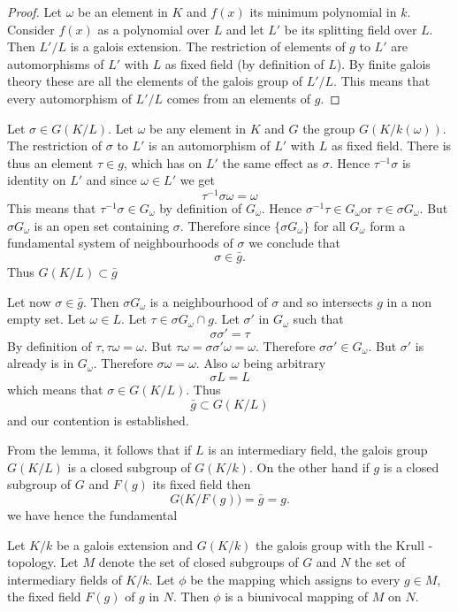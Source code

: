  \begin{proof}
Let $\omega$ be an element in $K$ and $f(x)$ its minimum polynomial in
$k$. Consider $f(x)$ as a polynomial over $L$ and let $L'$ be its
splitting field over $L$. Then $L' /L$ is  a galois extension. The
restriction of elements of $g$ to $L'$ are automorphisms of $L'$ with
$L$ as fixed field (by definition of $L$). By finite galois theory
these are all the elements of the galois group of $L' /L$. This means
that every automorphism of $L'/L$ comes from an elements of $g$.  
 \end{proof} 
 
 Let $\sigma \in G(K/L)$. Let $\omega$ be any element in $K$ and $G$
 the group $G(K/k (\omega ))$. The restriction of $\sigma$ to $L'$ is
 an automorphism of $L'$ with $L$ as fixed field. There is thus an
 element $\tau \in g$, which has on $L'$ the same effect as
 $\sigma$. Hence $\tau^{-1} \sigma$ is identity on $L'$ and since
 $\omega \in L'$ we get 
 $$
 \tau^{-1} \sigma \omega = \omega
 $$
  This means that $\tau^{-1 } \sigma \in G_\omega$ by definition of
 $G_{\omega}$. Hence $\sigma^{-1} \tau \in G_\omega$\pageoriginale or
  $\tau \in 
 \sigma G_{\omega}$. But $\sigma G_{\omega}$ is an open set containing
 $\sigma$. Therefore since $\{ \sigma G_\omega \}$ for all $G_\omega$
 form a fundamental system of neighbourhoods of $\sigma$ we conclude
 that 
 $$
 \sigma \in \bar{g}.
 $$
  Thus $G(K/L) \subset \bar{g}$
 
 Let now $\sigma \in \bar{g}$. Then $\sigma G_\omega$ is a
 neighbourhood of $\sigma$ and so intersects $g$ in a non empty
 set. Let $\omega \in L$. Let $\tau \in \sigma G_\omega \cap g$. Let
 $\sigma'$ in $G_{\omega}$ such that  
 $$
 \sigma \sigma' = \tau
 $$
  By definition of $\tau , \tau \omega = \omega$. But $\tau \omega =
  \sigma \sigma ' \omega = \omega$. Therefore $\sigma \sigma ' \in
  G_{\omega}$. But $\sigma '$ is already is in $G_{\omega}$. Therefore
  $\sigma \omega = \omega$. Also $\omega$ being arbitrary 
 $$
 \sigma L = L
 $$
 which means that $\sigma \in G(K / L)$. Thus
 $$
 \bar{g} \subset G(K/L)
 $$
 and our contention is established.
 
 From the lemma, it follows that if $L$ is an intermediary field, the
 galois group $G(K/L)$ is a closed subgroup of $G(K/k)$. On the other
 hand if $g$ is a closed subgroup of $G$ and $F(g)$ its fixed field
 then  
 $$
 G \big( K/F(g) \big) = \bar{g} = g .
 $$
 we have hence the fundamental

 \begin{thm}\label{c2:thm8}%
Let $K/k$ be a galois extension and $G(K/k)$ the
  galois group with the Krull - topology. Let $M$ denote the
  set of closed subgroups of $G$ and $N$ the set of
  intermediary fields of $K/k$. Let $\phi$  be the mapping which
  assigns to every $g \in M$, the fixed field $F(g)$ of\pageoriginale
  $g$ in $N$. Then $\phi$ is a biunivocal mapping of $M$ on $N$.  
 \end{thm} 
 
